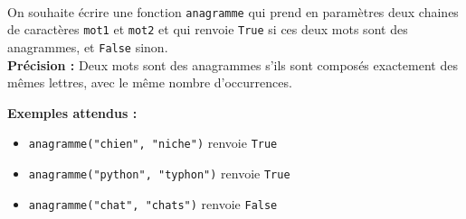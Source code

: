 \documentclass[11pt]{article}
\begin{document}
	\creerDoc
	
    \noindent
    \\
    On souhaite écrire une fonction \texttt{anagramme} qui prend en paramètres deux chaines de caractères \texttt{mot1} et \texttt{mot2} et qui renvoie \texttt{True} si ces deux mots sont des anagrammes, et \texttt{False} sinon.\\
    \textbf{Précision : } Deux mots sont des anagrammes s'ils sont composés exactement des mêmes lettres, avec le même nombre d'occurrences.

    \bigskip
    \textbf{Exemples attendus :}

    \begin{itemize}
        \item \texttt{anagramme("chien", "niche")} renvoie \texttt{True}
        \item \texttt{anagramme("python", "typhon")} renvoie \texttt{True}
        \item \texttt{anagramme("chat", "chats")} renvoie \texttt{False}
    \end{itemize}

    \bigskip

\end{document}
